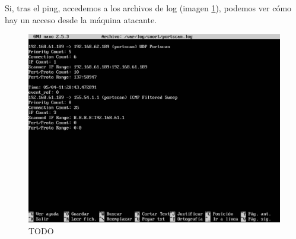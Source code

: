 \documentclass[a4,12pt,onecolum]{article}
\begin{document}
Si, tras el ping, accedemos a los archivos de log (imagen \ref{fig:snort4}), podemos ver cómo hay un acceso desde la máquina atacante.

\begin{figure}[htbp]
\centering
\includegraphics[width=1.0\textwidth]{./images/SnortPortLog.png}
\caption{TODO}
\label{fig:snort4}
\end{figure}
\end{document}
